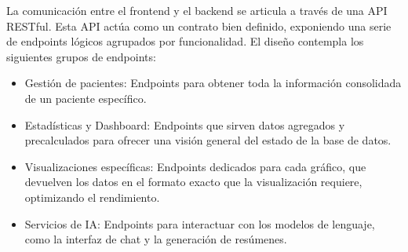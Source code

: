 
La comunicación entre el frontend y el backend se articula a través de una API RESTful. Esta API actúa como un contrato bien definido, exponiendo una serie de endpoints lógicos agrupados por funcionalidad. El diseño contempla los siguientes grupos de endpoints:

\begin{itemize}
    \item Gestión de pacientes: Endpoints para obtener toda la información consolidada de un paciente específico.
    \item Estadísticas y Dashboard: Endpoints que sirven datos agregados y precalculados para ofrecer una visión general del estado de la base de datos.
    \item Visualizaciones específicas: Endpoints dedicados para cada gráfico, que devuelven los datos en el formato exacto que la visualización requiere, optimizando el rendimiento.
    \item Servicios de IA: Endpoints para interactuar con los modelos de lenguaje, como la interfaz de chat y la generación de resúmenes.
\end{itemize}



